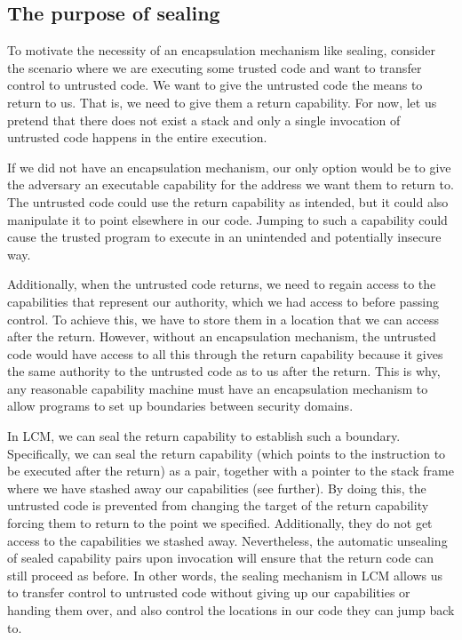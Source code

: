 \documentclass{jfp}
\newcommand{\trgcm}{\textsc{LCM}}
\newenvironment{jversion}{}{}
\begin{document}
\begin{jversion}
  \subsection{The purpose of sealing}
  \label{sec:purpose-sealing}
  To motivate the necessity of an encapsulation mechanism like sealing, consider the scenario where we are executing some trusted code and want to transfer control to untrusted code.
  We want to give the untrusted code the means to return to us.
  That is, we need to give them a return capability.
  For now, let us pretend that there does not exist a stack and only a single invocation of untrusted code happens in the entire execution.
  
  If we did not have an encapsulation mechanism, our only option would be to give the adversary an executable capability for the address we want them to return to.
  The untrusted code could use the return capability as intended, but it could also manipulate it to point elsewhere in our code.
  Jumping to such a capability could cause the trusted program to execute in an unintended and potentially insecure way.

  Additionally, when the untrusted code returns,  we need to regain access to the capabilities that represent our authority, which we had access to before passing control.
  To achieve this, we have to store them in a location that we can access after the return.
  However, without an encapsulation mechanism, the untrusted code would have access to all this through the return capability because it gives the same authority to the untrusted code as to us after the return.
  This is why, any reasonable capability machine must have an encapsulation mechanism to allow programs to set up boundaries between security domains.
  
  In \trgcm{}, we can seal the return capability to establish such a boundary.
  Specifically, we can seal the return capability (which points to the instruction to be executed after the return) as a pair, together with a pointer to the stack frame where we have stashed away our capabilities (see further).
  By doing this, the untrusted code is prevented from changing the target of the return capability forcing them to return to the point we specified.
  Additionally, they do not get access to the capabilities we stashed away.
  Nevertheless, the automatic unsealing of sealed capability pairs upon invocation will ensure that the return code can still proceed as before.
  In other words, the sealing mechanism in \trgcm{} allows us to transfer control to untrusted code without giving up our capabilities or handing them over, and also control the locations in our code they can jump back to.


\end{jversion}
\end{document}
